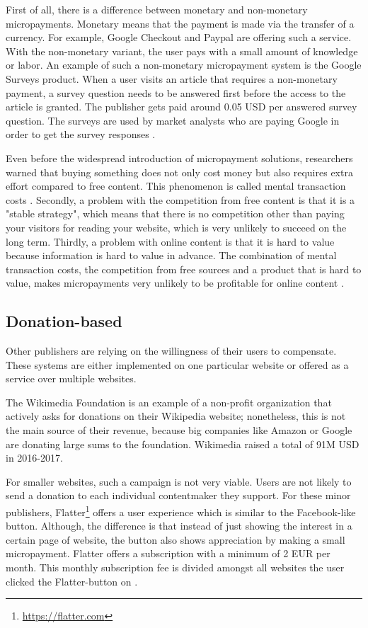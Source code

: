 First of all, there is a difference between monetary and non-monetary micropayments. Monetary means that the payment is made via the transfer of a currency. For example, Google Checkout and Paypal are offering such a service. With the non-monetary variant, the user pays with a small amount of knowledge or labor. An example of such a non-monetary micropayment system is the Google Surveys product. When a user visits an article that requires a non-monetary payment, a survey question needs to be answered first before the access to the article is granted. The publisher gets paid around 0.05 USD per answered survey question. The surveys are used by market analysts who are paying Google in order to get the survey responses \cite{googlesurveys}.

Even before the widespread introduction of micropayment solutions, researchers warned that buying something does not only cost money but also requires extra effort compared to free content. This phenomenon is called mental transaction costs \cite{szabo, shirky}. Secondly, a problem with the competition from free content is that it is a "stable strategy", which means that there is no competition other than paying your visitors for reading your website, which is very unlikely to succeed on the long term. Thirdly, a problem with online content is that it is hard to value because information is hard to value in advance. The combination of mental transaction costs, the competition from free sources and a product that is hard to value, makes micropayments very unlikely to be profitable for online content \cite{shirky}.

\subsection{Donation-based}

Other publishers are relying on the willingness of their users to compensate. These systems are either implemented on one particular website or offered as a service over multiple websites.

The Wikimedia Foundation is an example of a non-profit organization that actively asks for donations on their Wikipedia website; nonetheless, this is not the main source of their revenue, because big companies like Amazon or Google are donating large sums to the foundation. Wikimedia raised a total of 91M USD in 2016-2017. \cite{wikimediadonation}

For smaller websites, such a campaign is not very viable. Users are not likely to send a donation to each individual contentmaker they support. For these minor publishers, Flatter\footnote{\url{https://flatter.com}} offers a user experience which is similar to the Facebook-like button. Although, the difference is that instead of just showing the interest in a certain page of website, the button also shows appreciation by making a small micropayment. Flatter offers a subscription with a minimum of 2 EUR per month. This monthly subscription fee is divided amongst all websites the user clicked the Flatter-button on \cite{loll2010flattr}.

